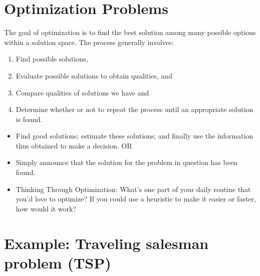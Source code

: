 \documentclass[
  letterpaper,
  DIV=11,
  numbers=noendperiod]{scrreprt}
\providecommand{\tightlist}{%
  \setlength{\itemsep}{0pt}\setlength{\parskip}{0pt}}\usepackage{longtable,booktabs,array}
\begin{document}

\chapter{Optimization Problems}\label{optimization-problems}

The goal of optimization is to find the best solution among many
possible options within a solution space. The process generally
involves:

\begin{enumerate}
\def\labelenumi{\arabic{enumi}.}
\tightlist
\item
  Find possible solutions,
\item
  Evaluate possible solutions to obtain qualities, and
\item
  Compare qualities of solutions we have and
\item
  Determine whether or not to repeat the process until an appropriate
  solution is found.
\end{enumerate}

\begin{itemize}
\item
  Find good solutions; estimate these solutions; and finally use the
  information thus obtained to make a decision. OR
\item
  Simply announce that the solution for the problem in question has been
  found.
\item
  Thinking Through Optimization: What's one part of your daily routine
  that you'd love to optimize? If you could use a heuristic to make it
  easier or faster, how would it work?
\end{itemize}


\chapter{Example: Traveling salesman problem
(TSP)}\label{example-traveling-salesman-problem-tsp}
\end{document}
